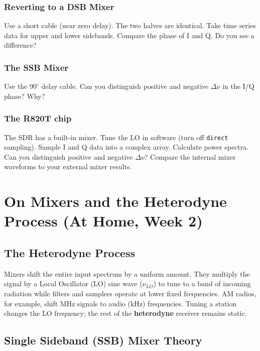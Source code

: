 \documentclass[11pt,preprint]{aastex}
\begin{document}
\subsubsection{Reverting to a DSB Mixer}
\label{dsbmixer}

\noindent
Use a short cable (near zero delay).
The two halves are identical.
Take time series data for upper and lower sidebands.
Compare the phase of I and Q.
Do you see a difference?

\subsubsection{The SSB Mixer}

\noindent
Use the $90^\circ$ delay cable.
Can you distinguish positive and negative $\Delta\nu$ in the I/Q phase?
Why?

\subsubsection{The R820T chip}

The SDR has a built-in mixer.
Tune the LO in software (turn off {\tt direct} sampling).
Sample I and Q data into a complex array.
Calculate power spectra.
Can you distinguish positive and negative $\Delta \nu$?
Compare the internal mixer waveforms to your external mixer results.


\section{On Mixers and the Heterodyne Process (At Home, Week 2)}
\label{hetereo}

\subsection{The Heterodyne Process}
%
\noindent
Mixers shift the entire input spectrum by a uniform amount.
They multiply the signal by a Local Oscillator (LO) sine wave ($\nu_{LO}$)
to tune to a band of incoming radiation while filters and samplers
operate at lower fixed frequencies.
AM radios, for example, shift MHz signals to audio (kHz) frequencies.
Tuning a station changes the LO frequency; 
the rest of the {\bf heterodyne} receiver remains static.


\subsection{Single Sideband (SSB) Mixer Theory}
\end{document}
